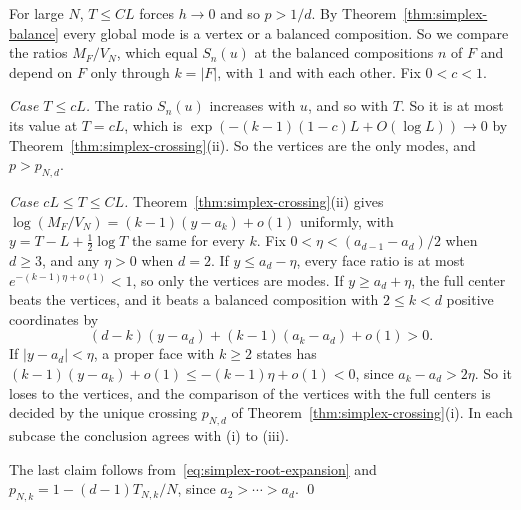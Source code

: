 For large $N$, $T\le CL$ forces $h\to0$ and so $p>1/d$. By
Theorem~\ref{thm:simplex-balance} every global mode is a vertex or a balanced
composition. So we compare the ratios $M_F/V_N$, which equal $S_n(u)$ at the balanced
compositions $n$ of $F$ and depend on $F$ only through $k=\lvert F\rvert$, with $1$ and with each
other. Fix $0<c<1$.

\emph{Case $T\le cL$.} The ratio $S_n(u)$ increases with $u$, and so with $T$. So it is at most
its value at $T=cL$, which is $\exp(-(k-1)(1-c)L+O(\log L))\to0$ by
Theorem~\ref{thm:simplex-crossing}(ii). So the vertices are the only modes, and $p>p_{N,d}$.

\emph{Case $cL\le T\le CL$.} Theorem~\ref{thm:simplex-crossing}(ii) gives
$\log(M_F/V_N)=(k-1)(y-a_k)+o(1)$ uniformly, with $y=T-L+\frac12\log T$ the same for every $k$.
Fix $0<\eta<(a_{d-1}-a_d)/2$ when $d\ge3$, and any $\eta>0$ when $d=2$.
If $y\le a_d-\eta$, every face ratio is at most
$e^{-(k-1)\eta+o(1)}<1$, so only the vertices are modes. If
$y\ge a_d+\eta$, the full center beats the vertices, and it beats a
balanced composition with $2\le k<d$ positive coordinates by
\[
(d-k)(y-a_d)+(k-1)(a_k-a_d)+o(1)>0 .
\]
If $|y-a_d|<\eta$, a proper face with $k\ge2$ states has
$(k-1)(y-a_k)+o(1)\le-(k-1)\eta+o(1)<0$, since $a_k-a_d>2\eta$. So it
loses to the vertices, and the comparison of the vertices with the full centers
is decided by the unique crossing $p_{N,d}$ of Theorem~\ref{thm:simplex-crossing}(i).
In each subcase the conclusion agrees with (i) to (iii).

The last claim follows from~\eqref{eq:simplex-root-expansion} and
$p_{N,k}=1-(d-1)T_{N,k}/N$, since $a_2>\cdots>a_d$. \qed
